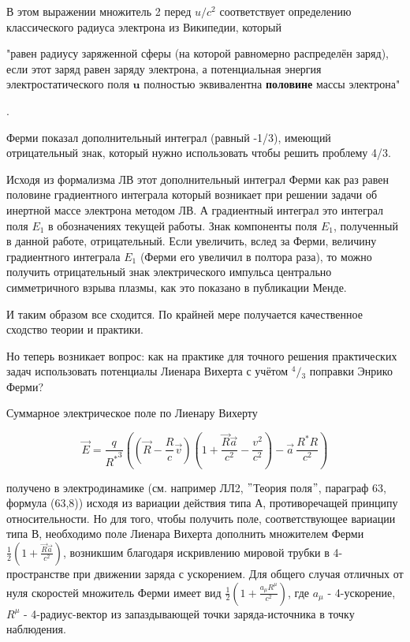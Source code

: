 \documentclass[12pt]{article}
\begin{document}
В этом выражении множитель 2 перед ${u}/{c^2}$ соответствует определению классического радиуса электрона из Википедии, который \begin{itshape}"равен радиусу заряженной сферы (на которой равномерно распределён заряд), если этот заряд равен заряду электрона, а потенциальная энергия электростатического поля $\textbf{u}$ полностью эквивалентна \textbf{половине} массы электрона"\end{itshape}.



Ферми показал дополнительный интеграл (равный -1/3), имеющий отрицательный знак, который нужно использовать чтобы решить проблему 4/3.

Исходя из формализма ЛВ этот дополнительный интеграл Ферми как раз равен половине градиентного интеграла который возникает при решении задачи об инертной массе электрона методом ЛВ. А градиентный интеграл это интеграл поля $E_1$ в обозначениях текущей работы. Знак компоненты поля $E_1$, полученный в данной работе, отрицательный. Если увеличить, вслед за Ферми, величину градиентного интеграла $E_1$ (Ферми его увеличил в полтора раза), то можно получить отрицательный знак электрического импульса центрально симметричного взрыва плазмы, как это показано в публикации Менде.

И таким образом все сходится. По крайней мере получается качественное сходство теории и практики.

Но теперь возникает вопрос: как на практике для точного решения практических задач использовать потенциалы Лиенара Вихерта с учётом ${}^{4}/{}_{3}$ поправки Энрико Ферми?


Суммарное электрическое поле по Лиенару Вихерту

$$\vec{E} = \frac{q}{{{R}^{*}}^{3}}\left( \left(\vec{R}-\frac{R}{c}\vec{v} \right) \left(1 + \frac{\vec{R}\vec{a}}{c^2} - \frac{v^2}{c^2} \right) - \vec{a}\,\frac{{R}^{*}R}{c^2} \right)$$

получено в электродинамике (см. например ЛЛ2, $"$Теория поля$"$, параграф 63, формула (63,8)) исходя из вариации действия типа А, противоречащей принципу относительности. Но для того, чтобы получить поле, соответствующее вариации типа В, необходимо поле Лиенара Вихерта дополнить множителем Ферми $\frac{1}{2}\left(1 + \frac{\vec{R}\vec{a}}{c^2}\right)$, возникшим благодаря искривлению мировой трубки в 4-пространстве при движении заряда с ускорением. Для общего случая отличных от нуля скоростей множитель Ферми имеет вид $\frac{1}{2}\left(1+\frac{a_{\mu} R^{\mu}}{c^2}\right)$, где $a_{\mu}$ - 4-ускорение, $R^{\mu}$ - 4-радиус-вектор из запаздывающей точки заряда-источника в точку наблюдения.
\end{document}
